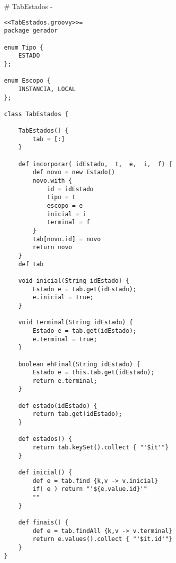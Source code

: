 # TabEstados {-}

\begin{lstlisting}
<<TabEstados.groovy>>=
package gerador

enum Tipo {
    ESTADO
};

enum Escopo {
    INSTANCIA, LOCAL
};

class TabEstados {

    TabEstados() {
        tab = [:]
    }

    def incorporar( idEstado,  t,  e,  i,  f) {
        def novo = new Estado()
        novo.with {
            id = idEstado
            tipo = t
            escopo = e
            inicial = i
            terminal = f
        }
        tab[novo.id] = novo
        return novo
    }
    def tab

    void inicial(String idEstado) {
        Estado e = tab.get(idEstado);
        e.inicial = true;
    }

    void terminal(String idEstado) {
        Estado e = tab.get(idEstado);
        e.terminal = true;
    }

    boolean ehFinal(String idEstado) {
        Estado e = this.tab.get(idEstado);
        return e.terminal;
    }

    def estado(idEstado) {
        return tab.get(idEstado);
    }

    def estados() {
        return tab.keySet().collect { "'$it'"}
    }

    def inicial() {
        def e = tab.find {k,v -> v.inicial}
        if( e ) return "'${e.value.id}'"
        ""
    }

    def finais() {
        def e = tab.findAll {k,v -> v.terminal}
        return e.values().collect { "'$it.id'"}
    }
}
\end{lstlisting}




